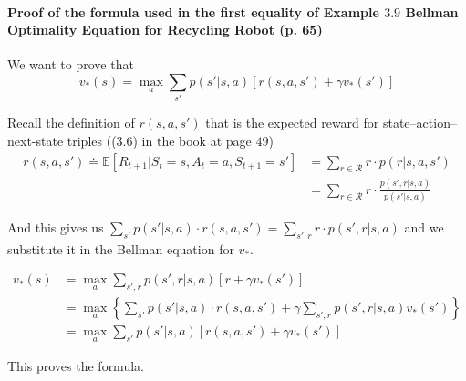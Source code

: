 \documentclass[10pt,a4paper]{article}
\begin{document}
\paragraph{Proof of the formula used in the first equality of Example $3.9$ Bellman Optimality Equation for Recycling Robot (p. 65)}

We want to prove that 
\begin{equation}
v_*(s) = \max_{a} \sum_{s'} p(s' \lvert s, a) \left[r(s, a, s') + \gamma v_*(s')\right]
\end{equation}

Recall the definition of $r(s, a, s')$ that is the expected reward for state--action--next-state triples (($3.6$) in the book at page $49$)
\begin{equation}
\begin{split}
r(s, a, s') \doteq \mathbb{E}[R_{t+1} \lvert S_t = s, A_t = a, S_{t+1} = s'] &= \sum_{r \in \mathcal{R}} r \cdot p(r \lvert s, a, s')\\
&= \sum_{r \in \mathcal{R}} r \cdot \frac{p(s', r \lvert s, a)}{p(s' \lvert s, a)}
\end{split}
\end{equation}

And this gives us $\sum_{s'} p(s' \lvert s, a) \cdot r(s, a, s') = \sum_{s', r} r \cdot p(s', r \lvert s, a)$ and we substitute it in the Bellman equation for $v_*$.

\begin{equation}
\begin{split}
v_*(s) &= \max_{a} \sum_{s', r} p(s', r \lvert s, a) \left[r + \gamma v_*(s')\right]\\
&=\max_{a}\left\{\sum_{s'} p(s' \lvert s, a) \cdot r(s, a, s') + \gamma \sum_{s', r} p(s', r \lvert s, a) v_*(s')\right\}\\
&= \max_{a} \sum_{s'} p(s' \lvert s, a) \left[r(s, a, s') + \gamma v_*(s')\right]
\end{split}
\end{equation}

This proves the formula.
\end{document}
